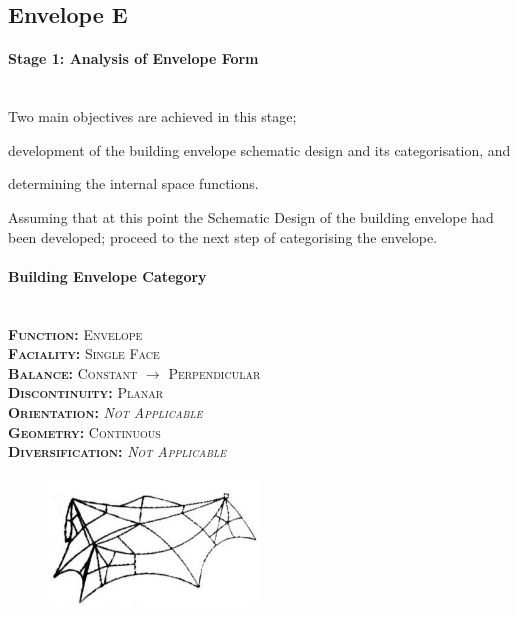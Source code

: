 \clearpage	
\subsection{Envelope E}

\paragraph{Stage 1: Analysis of Envelope Form}\mbox{}\\[2mm]

Two main objectives are achieved in this stage; \begin{inparaenum}[a)] \item development of the building envelope schematic design and its categorisation, and \item determining the internal space functions.\end{inparaenum}

Assuming that at this point the Schematic Design of the building envelope had been developed; proceed to the next step of categorising the envelope.

\setlength{\columnseprule}{0pt}
\begin{multicols}{2}
	\paragraph{Building Envelope Category}\mbox{}\\
	\vspace {0.5cm}	
	\small \textsc{\textbf{Function:} Envelope\\
	\vspace {0.3cm}
	\textbf{Faciality:} Single Face\\
	\vspace {0.3cm}
	\textbf{Balance:} Constant $\rightarrow$ Perpendicular\\
	\vspace {0.3cm}
	\textbf{Discontinuity:} Planar\\
	\vspace {0.3cm}
	\textbf{Orientation:} \emph{Not Applicable}\\
	\vspace {0.3cm}
	\textbf{Geometry:} Continuous\\
	\vspace {0.3cm}
	\textbf{Diversification:} \emph{Not Applicable}\\}
	\normalsize
	\columnbreak
	\vspace{5.5cm}
	\begin{figure}[H]
		\centering
		\includegraphics[width=0.5\textwidth]{./Images/22-Envelope13}
	\end{figure}
\end{multicols}
\vspace{-5mm}

